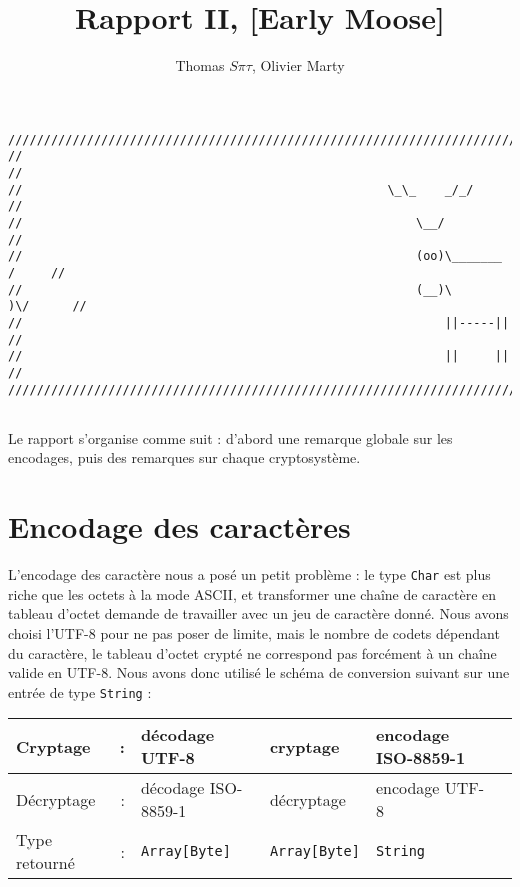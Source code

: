 \documentclass[11pt]{article} %
\title{Rapport II,  [Early Moose]}
\author{Thomas $S\pi\tau$, Olivier Marty}
\begin{document}
\maketitle

\begin{verbatim}
////////////////////////////////////////////////////////////////////////////////
//                                                                            //
//                                                   \_\_    _/_/             //
//                                                       \__/                 //
//                                                       (oo)\_______   /     //
//                                                       (__)\       )\/      //
//                                                           ||-----||        //
//                                                           ||     ||        //
////////////////////////////////////////////////////////////////////////////////  


\end{verbatim}

Le rapport s'organise comme suit : d'abord une remarque globale sur les encodages, puis des remarques sur chaque cryptosystème.

\section{Encodage des caractères}

L'encodage des caractère nous a posé un petit problème : le type \texttt{Char} est plus riche que les octets à la mode ASCII, et transformer une chaîne de caractère en tableau d'octet demande de travailler avec un jeu de caractère donné. Nous avons choisi l'UTF-8 pour ne pas poser de limite, mais le nombre de codets dépendant du caractère, le tableau d'octet crypté ne correspond pas forcément à un chaîne valide en UTF-8.
Nous avons donc utilisé le schéma de conversion suivant sur une entrée de type \texttt{String} :
\begin{center}
\begin{tabular}{|lr|l|l|l|l|}
  \hline
  Cryptage & : & décodage UTF-8 & cryptage & encodage ISO-8859-1 \\
  \hline
  Décryptage & : & décodage ISO-8859-1 & décryptage & encodage UTF-8 \\
  \hline
  Type retourné & : & \texttt{Array[Byte]} & \texttt{Array[Byte]} & \texttt{String}\\
  \hline
\end{tabular}
\end{center}
\end{document}

